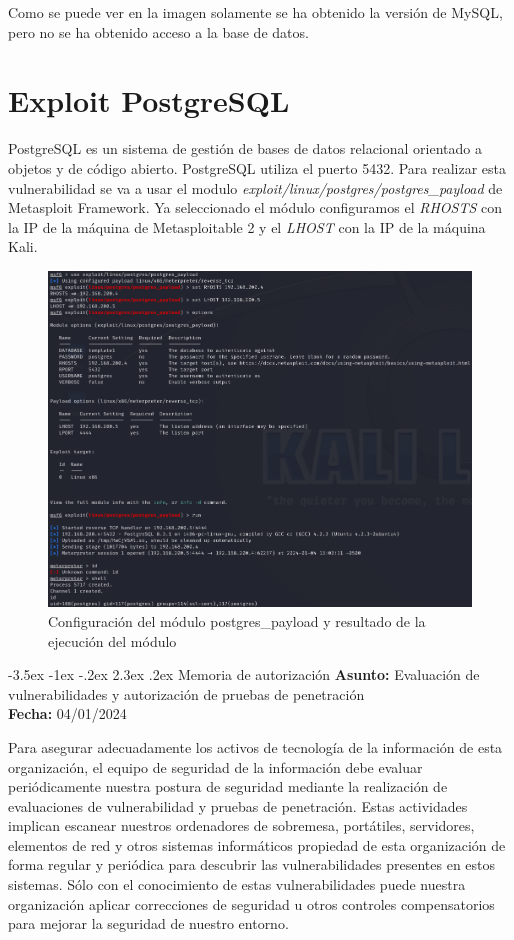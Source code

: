 \documentclass[11pt]{report}
\makeatletter
\renewcommand\chapter{\@startsection{chapter}{0}{\z@}%
    {-3.5ex \@plus -1ex \@minus -.2ex}%
    {2.3ex \@plus.2ex}%
    {\normalfont\Large\bfseries}}
\makeatother
\begin{document}
Como se puede ver en la imagen solamente se ha obtenido la versión de MySQL, pero no se ha obtenido acceso a la base de datos.

\newpage

\section{Exploit PostgreSQL}
PostgreSQL es un sistema de gestión de bases de datos relacional orientado a objetos y de código abierto. PostgreSQL utiliza el puerto 5432. Para realizar esta vulnerabilidad
se va a usar el modulo \emph{exploit/linux/postgres/postgres\_payload} de Metasploit Framework. Ya seleccionado el módulo configuramos el \emph{RHOSTS} con la IP de la máquina de Metasploitable 2 y
el \emph{LHOST} con la IP de la máquina Kali.
\begin{figure}[H]
  \centering
  \includegraphics[scale=0.65]{img/postgresql.png}
  \caption{Configuración del módulo postgres\_payload y resultado de la ejecución del módulo}
\end{figure}


\newpage

\chapter{Memoria de autorización}
\textbf{Asunto:} Evaluación de vulnerabilidades y autorización de pruebas de penetración \\
\textbf{Fecha:} 04/01/2024 

Para asegurar adecuadamente los activos de tecnología de la información de esta organización, el equipo de seguridad de la información debe evaluar periódicamente nuestra postura de seguridad mediante la realización de evaluaciones de vulnerabilidad y pruebas de penetración. Estas actividades implican escanear nuestros ordenadores de sobremesa, portátiles, servidores, elementos de red y otros sistemas informáticos propiedad de esta organización de forma regular y periódica para descubrir las vulnerabilidades presentes en estos sistemas. Sólo con el conocimiento de estas vulnerabilidades puede nuestra organización aplicar correcciones de seguridad u otros controles compensatorios para mejorar la seguridad de nuestro entorno.
\end{document}
